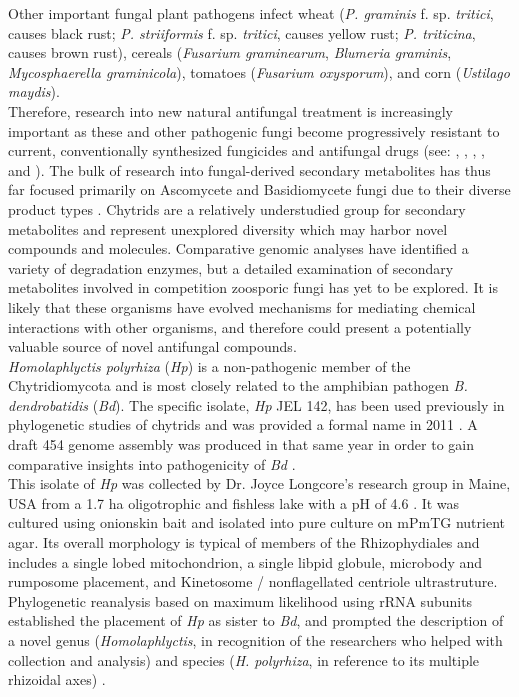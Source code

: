 \indent Other important fungal plant pathogens infect wheat (\textit{P. graminis} f. sp. \textit{tritici}, causes black rust; \textit{P. striiformis} f. sp. \textit{tritici}, causes yellow rust; \textit{P. triticina}, causes brown rust), cereals (\textit{Fusarium graminearum}, \textit{Blumeria graminis}, \textit{Mycosphaerella graminicola}), tomatoes (\textit{Fusarium oxysporum}), and corn (\textit{Ustilago maydis}).\\
\indent Therefore, research into new natural antifungal treatment is increasingly important as these and other pathogenic fungi become progressively resistant to current, conventionally synthesized fungicides and antifungal drugs (see: \cite{Bossche1998}, \cite{Kontoyiannis2002}, \cite{Kretschmer2009}, \cite{Leroch2011}, and \cite{Pfaller2012}). The bulk of research into fungal-derived secondary metabolites has thus far focused primarily on Ascomycete and Basidiomycete fungi due to their diverse product types \cite{Berdy2012}. Chytrids are a relatively understudied group for secondary metabolites and represent unexplored diversity which may harbor novel compounds and molecules. Comparative genomic analyses have identified a variety of degradation enzymes, but a detailed examination of secondary metabolites involved in competition zoosporic fungi has yet to be explored. It is likely that these organisms have evolved mechanisms for mediating chemical interactions with other organisms, and therefore could present a potentially valuable source of novel antifungal compounds.\\
\indent \textit{Homolaphlyctis polyrhiza} (\textit{Hp}) is a non-pathogenic member of the Chytridiomycota and is most closely related to the amphibian pathogen \textit{B. dendrobatidis} (\textit{Bd}). The specific isolate, \textit{Hp} JEL 142, has been used previously in phylogenetic studies of chytrids \cite{James2000,James2006sixGene,Letcher2008} and was provided a formal name in 2011 \cite{Longcore2011}. A draft 454 genome assembly was produced in that same year in order to gain comparative insights into pathogenicity of \textit{Bd} \cite{Joneson2011}.\\
\indent This isolate of \textit{Hp} was collected by Dr. Joyce Longcore's research group in Maine, USA from a 1.7 ha oligotrophic and fishless lake with a pH of 4.6 \cite{Davis1994,Rhodes1995}. It was cultured using onionskin bait and isolated into pure culture on mPmTG nutrient agar. Its overall morphology is typical of members of the Rhizophydiales \cite{Barr1978} and includes a single lobed mitochondrion, a single libpid globule, microbody and rumposome placement, and Kinetosome / nonflagellated centriole ultrastruture. Phylogenetic reanalysis based on maximum likelihood using rRNA subunits established the placement of \textit{Hp} as sister to \textit{Bd}, and prompted the description of a novel genus (\textit{Homolaphlyctis}, in recognition of the researchers who helped with collection and analysis) and species (\textit{H. polyrhiza}, in reference to its multiple rhizoidal axes) \cite{Longcore2011}.\\
